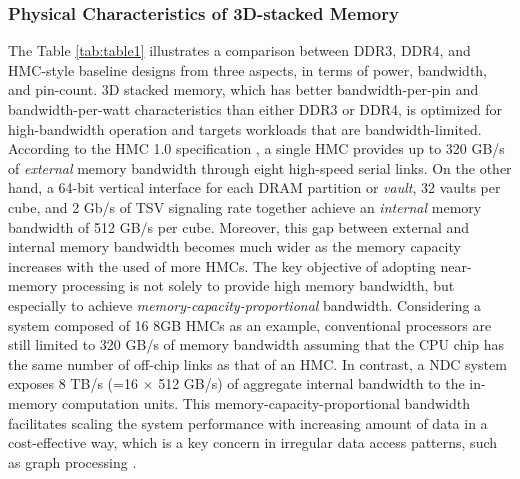 \documentclass[letterpaper, 11pt, conference, margin=1in]{ieeeconf}   %
\begin{document}
\subsubsection{\bf Physical Characteristics of 3D-stacked Memory}
The Table \ref{tab:table1} illustrates a comparison between DDR3, DDR4, and HMC-style baseline designs from three aspects, in terms of power, bandwidth, and pin-count. 3D stacked memory, which has better bandwidth-per-pin and bandwidth-per-watt characteristics than either DDR3 or DDR4, is optimized for high-bandwidth operation and targets workloads that are bandwidth-limited. According to the HMC 1.0 specification \cite{HMC-1.0}, a single HMC provides up to 320 GB/s of \textit{external} memory bandwidth through eight high-speed serial links. On the other hand, a 64-bit vertical interface for each DRAM partition or \textit{vault}, 32 vaults per cube, and 2 Gb/s of TSV signaling rate \cite{Pugsley2014NDCAT} together achieve an \textit{internal} memory bandwidth of 512 GB/s per cube. Moreover, this gap between external and internal memory bandwidth becomes much wider as the memory capacity increases with the used of more HMCs. The key objective of adopting near-memory processing is not solely to provide high memory bandwidth, but especially to achieve \textit{memory-capacity-proportional} bandwidth. Considering a system composed of 16 8GB HMCs as an example, conventional processors are still limited to 320 GB/s of memory bandwidth assuming that the CPU chip has the same number of off-chip links as that of an HMC. In contrast, a NDC system exposes 8 TB/s (=16 $\times$ 512 GB/s) of aggregate internal bandwidth to the in-memory computation units. This memory-capacity-proportional bandwidth facilitates scaling the system performance with increasing amount of data in a cost-effective way, which is a key concern in irregular data access patterns, such as graph processing \cite{Ahn:2015:SPA:2749469.2750386}.\\

\end{document}
